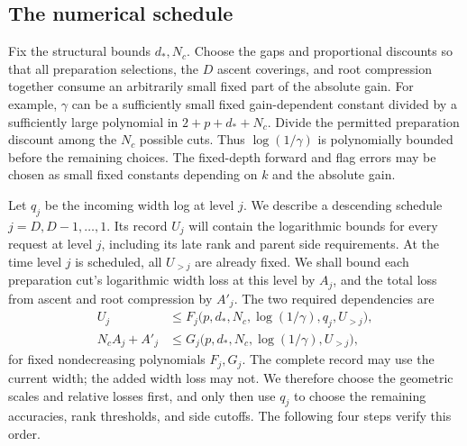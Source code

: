 \subsection{The numerical schedule}

Fix the structural bounds $d_*,N_c$.  Choose the gaps and proportional
discounts so that all preparation selections, the $D$ ascent coverings,
and root compression together consume an arbitrarily small fixed part
of the absolute gain.  For example, $\gamma$ can be a sufficiently small
fixed gain-dependent constant divided by a sufficiently large polynomial
in $2+p+d_*+N_c$.  Divide the permitted preparation discount among the
$N_c$ possible cuts.  Thus $\log(1/\gamma)$ is polynomially bounded before
the remaining choices.  The fixed-depth forward and flag errors may be
chosen as small fixed constants depending on $k$ and the absolute gain.

Let $q_j$ be the incoming width log at level $j$.  We describe a descending
schedule $j=D,D-1,\ldots,1$.  Its record $U_j$ will contain the logarithmic
bounds for every request at level $j$, including its late rank and parent
side requirements.  At the time level $j$ is scheduled, all $U_{>j}$ are
already fixed.  We shall bound each preparation cut's logarithmic width
loss at this level by $A_j$, and the total loss from ascent and root
compression by $A'_j$.  The two required dependencies are
\begin{align*}
 U_j&\le F_j\bigl(p,d_*,N_c,\log(1/\gamma),q_j,U_{>j}\bigr),\\
 N_c A_j+A'_j
    &\le G_j\bigl(p,d_*,N_c,\log(1/\gamma),U_{>j}\bigr),
\end{align*}
for fixed nondecreasing polynomials $F_j,G_j$.  The complete record may
use the current width; the added width loss may not.  We therefore choose
the geometric scales and relative losses first, and only then use $q_j$
to choose the remaining accuracies, rank thresholds, and side cutoffs.
The following four steps verify this order.

